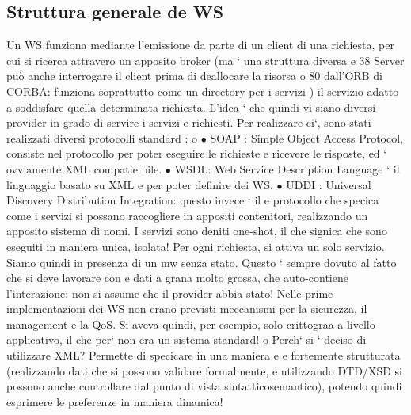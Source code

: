 \documentclass[a4paper,12pt]{article}
\begin{document}
\subsection{Struttura generale de WS}
Un WS funziona mediante l'emissione da parte di un client di una richiesta,
per cui si ricerca attravero un apposito broker (ma ` una struttura diversa
e
38 Server
può anche interrogare il client prima di deallocare la risorsa
o
80
dall'ORB di CORBA: funziona soprattutto come un directory per i servizi ) il
servizio adatto a soddisfare quella determinata richiesta.
L'idea ` che quindi vi siano diversi provider in grado di servire i servizi
e
richiesti. Per realizzare ci`, sono stati realizzati diversi protocolli standard :
o
$\bullet$ SOAP : Simple Object Access Protocol, consiste nel protocollo per poter
eseguire le richieste e ricevere le risposte, ed ` ovviamente XML compatie
bile.
$\bullet$ WSDL: Web Service Description Language ` il linguaggio basato su XML
e
per poter definire dei WS.
$\bullet$ UDDI : Universal Discovery Distribution Integration: questo invece ` il
e
protocollo che specica come i servizi si possano raccogliere in appositi
contenitori, realizzando un apposito sistema di nomi.
I servizi sono deniti one-shot, il che signica che sono eseguiti in maniera unica,
isolata! Per ogni richiesta, si attiva un solo servizio. Siamo quindi in presenza
di un mw senza stato. Questo ` sempre dovuto al fatto che si deve lavorare con
e
dati a grana molto grossa, che auto-contiene l'interazione: non si assume che il
provider abbia stato!
Nelle prime implementazioni dei WS non erano previsti meccanismi per la
sicurezza, il management e la QoS. Si aveva quindi, per esempio, solo crittograa
a livello applicativo, il che per` non era un sistema standard!
o
Perch` si ` deciso di utilizzare XML? Permette di specicare in una maniera
e e
fortemente strutturata (realizzando dati che si possono validare formalmente, e
utilizzando DTD/XSD si possono anche controllare dal punto di vista sintatticosemantico), potendo quindi esprimere le
preferenze in maniera dinamica!
\end{document}
